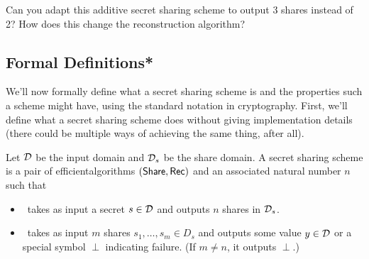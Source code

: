 \begin{exercise}
    Can you adapt this additive secret sharing scheme to output 
    3 shares instead of 2? How does this change the reconstruction 
    algorithm?
\end{exercise}

\subsection{Formal Definitions*}\label{sec:formal-defs}

We'll now formally define what a secret sharing scheme is and the 
properties such a scheme might have, using the standard notation in 
cryptography. First, we'll define what a secret sharing scheme 
does without giving implementation details (there could be multiple ways 
of achieving the same thing, after all). 

\begin{definition}\label{def:ss}
    Let $\mathcal{D}$ be the input domain and $\mathcal{D}_s$ be the share domain.
    A secret sharing scheme is a pair of efficient\footnotemark algorithms 
    $(\mathsf{Share}, \mathsf{Rec})$ and an associated natural number $n$ such that

    \begin{itemize}
        \item \share~takes as input a secret $s \in \mathcal{D}$ and outputs $n$ 
        shares in $\mathcal{D}_s$.
        \item \rec~takes as input $m$ shares $s_1, \ldots, s_m \in D_s$ 
        and outputs some value $y \in \mathcal{D}$ or a special symbol $\perp$ 
        indicating failure. (If $m \neq n$, it outputs $\perp$.)
    \end{itemize}
\end{definition}


